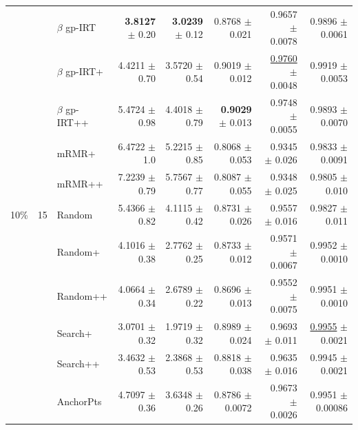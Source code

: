 \begin{longtable}{llp{}rrrrr}
 &  & $\beta$ gp-IRT & \textbf{3.8127} {\scriptsize $\pm$ 0.20} & \textbf{3.0239} {\scriptsize $\pm$ 0.12} & 0.8768 {\scriptsize $\pm$ 0.021} & 0.9657 {\scriptsize $\pm$ 0.0078} & 0.9896 {\scriptsize $\pm$ 0.0061} \\
 &  & $\beta$ gp-IRT+ & 4.4211 {\scriptsize $\pm$ 0.70} & 3.5720 {\scriptsize $\pm$ 0.54} & 0.9019 {\scriptsize $\pm$ 0.012} & \underline{0.9760} {\scriptsize $\pm$ 0.0048} & 0.9919 {\scriptsize $\pm$ 0.0053} \\
 &  & $\beta$ gp-IRT++ & 5.4724 {\scriptsize $\pm$ 0.98} & 4.4018 {\scriptsize $\pm$ 0.79} & \textbf{0.9029} {\scriptsize $\pm$ 0.013} & 0.9748 {\scriptsize $\pm$ 0.0055} & 0.9893 {\scriptsize $\pm$ 0.0070} \\
 &  & mRMR+ & 6.4722 {\scriptsize $\pm$ 1.0} & 5.2215 {\scriptsize $\pm$ 0.85} & 0.8068 {\scriptsize $\pm$ 0.053} & 0.9345 {\scriptsize $\pm$ 0.026} & 0.9833 {\scriptsize $\pm$ 0.0091} \\
 &  & mRMR++ & 7.2239 {\scriptsize $\pm$ 0.79} & 5.7567 {\scriptsize $\pm$ 0.77} & 0.8087 {\scriptsize $\pm$ 0.055} & 0.9348 {\scriptsize $\pm$ 0.025} & 0.9805 {\scriptsize $\pm$ 0.010} \\
\midrule
10\% & 15 & Random & 5.4366 {\scriptsize $\pm$ 0.82} & 4.1115 {\scriptsize $\pm$ 0.42} & 0.8731 {\scriptsize $\pm$ 0.026} & 0.9557 {\scriptsize $\pm$ 0.016} & 0.9827 {\scriptsize $\pm$ 0.011} \\
 &  & Random+ & 4.1016 {\scriptsize $\pm$ 0.38} & 2.7762 {\scriptsize $\pm$ 0.25} & 0.8733 {\scriptsize $\pm$ 0.012} & 0.9571 {\scriptsize $\pm$ 0.0067} & 0.9952 {\scriptsize $\pm$ 0.0010} \\
 &  & Random++ & 4.0664 {\scriptsize $\pm$ 0.34} & 2.6789 {\scriptsize $\pm$ 0.22} & 0.8696 {\scriptsize $\pm$ 0.013} & 0.9552 {\scriptsize $\pm$ 0.0075} & 0.9951 {\scriptsize $\pm$ 0.0010} \\
 &  & Search+ & 3.0701 {\scriptsize $\pm$ 0.32} & 1.9719 {\scriptsize $\pm$ 0.32} & 0.8989 {\scriptsize $\pm$ 0.024} & 0.9693 {\scriptsize $\pm$ 0.011} & \underline{0.9955} {\scriptsize $\pm$ 0.0021} \\
 &  & Search++ & 3.4632 {\scriptsize $\pm$ 0.53} & 2.3868 {\scriptsize $\pm$ 0.53} & 0.8818 {\scriptsize $\pm$ 0.038} & 0.9635 {\scriptsize $\pm$ 0.016} & 0.9945 {\scriptsize $\pm$ 0.0021} \\
 &  & AnchorPts & 4.7097 {\scriptsize $\pm$ 0.36} & 3.6348 {\scriptsize $\pm$ 0.26} & 0.8786 {\scriptsize $\pm$ 0.0072} & 0.9673 {\scriptsize $\pm$ 0.0026} & 0.9951 {\scriptsize $\pm$ 0.00086} \\

\end{longtable}
